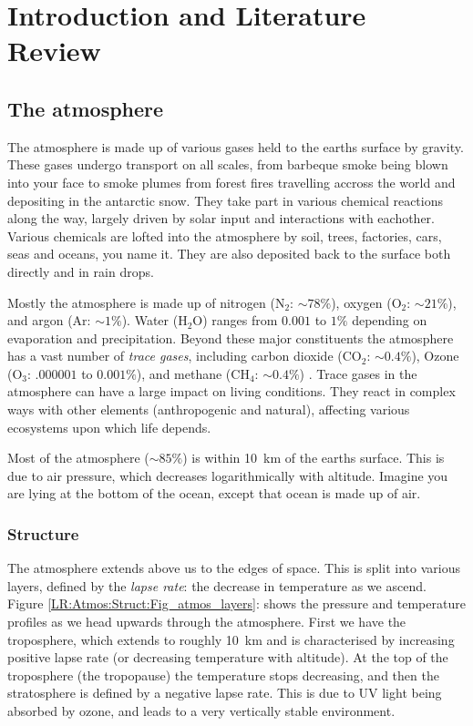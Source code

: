 \chapter{Introduction and Literature Review} %
\label{LR}

\section{The atmosphere}
\label{LR:Atmos}
  The atmosphere is made up of various gases held to the earths surface by gravity. 
  These gases undergo transport on all scales, from barbeque smoke being blown into your face to smoke plumes from forest fires travelling accross the world and depositing in the antarctic snow.
  They take part in various chemical reactions along the way, largely driven by solar input and interactions with eachother.
  Various chemicals are lofted into the atmosphere by soil, trees, factories, cars, seas and oceans, you name it.
  They are also deposited back to the surface both directly and in rain drops.
  
  Mostly the atmosphere is made up of nitrogen (N$_2$: $\sim 78\%$), oxygen (O$_2$: $\sim 21\%$), and argon (Ar: $\sim 1\%$).
  Water (H$_2$O) ranges from $0.001$ to $1\%$ depending on evaporation and precipitation.
  Beyond these major constituents the atmosphere has a vast number of \textit{trace gases}, including carbon dioxide (CO$_2$: $\sim 0.4\%$), Ozone (O$_3$: $.000001$ to $0.001\%$), and methane (CH$_4$: $\sim 0.4\%$) \cite[][Ch. 2]{BrasseurJacob2017}.
  Trace gases in the atmosphere can have a large impact on living conditions.
  They react in complex ways with other elements (anthropogenic and natural), affecting various ecosystems upon which life depends.
  
  Most of the atmosphere ($\sim 85\%$) is within 10~km of the earths surface.
  This is due to air pressure, which decreases logarithmically with altitude.
  Imagine you are lying at the bottom of the ocean, except that ocean is made up of air.

  
  \subsection{Structure}
  \label{LR:Atmos:Struct}
    
    The atmosphere extends above us to the edges of space. 
    This is split into various layers, defined by the \textit{lapse rate}: the decrease in temperature as we ascend.
    Figure \ref{LR:Atmos:Struct:Fig_atmos_layers}: shows the pressure and temperature profiles as we head upwards through the atmosphere.
    First we have the troposphere, which extends to roughly 10~km and is characterised by increasing positive lapse rate (or decreasing temperature with altitude).
    At the top of the troposphere (the tropopause) the temperature stops decreasing, and then the stratosphere is defined by a negative lapse rate.
    This is due to UV light being absorbed by ozone, and leads to a very vertically stable environment.
    
